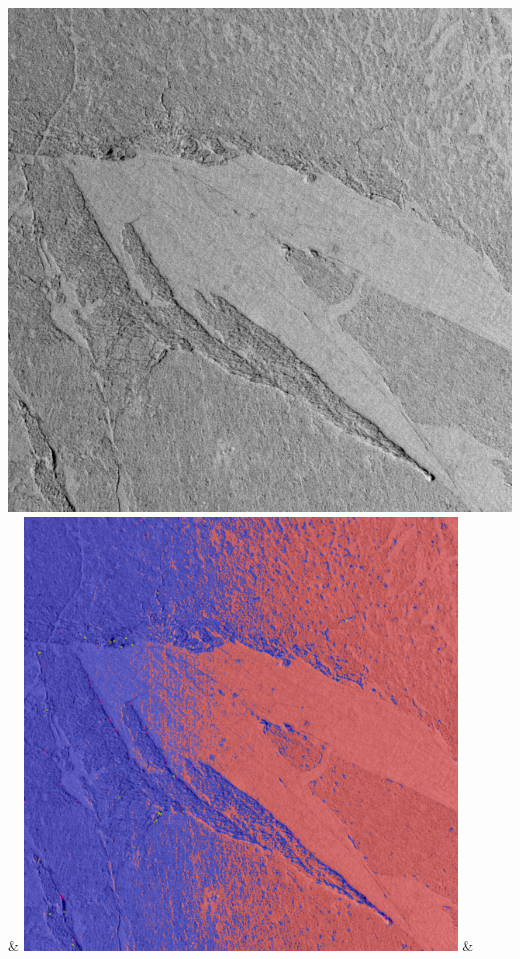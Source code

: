 \begin{table}[h!]
\begin{tabularx}{\textwidth}
		\includegraphics[width=0.9\linewidth]{images/p03/p03_03.png} &
		\includegraphics[width=0.9\linewidth]{images/gen/filter_size/p03_03.png_0.25.png} &

\end{tabularx}
\end{table}
